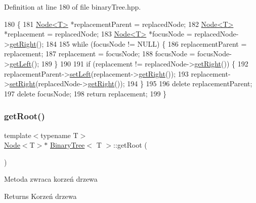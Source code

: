 Definition at line 180 of file binary\+Tree.\+hpp.


\begin{DoxyCode}
180                                                            \{
181             \hyperlink{classNode}{Node<T>} *replacementParent = replacedNode;
182             \hyperlink{classNode}{Node<T>} *replacement = replacedNode;
183             \hyperlink{classNode}{Node<T>} *focusNode = replacedNode->\hyperlink{classNode_af9078f2651b16fc1a3502d7927761df1}{getRight}();
184 
185             \textcolor{keywordflow}{while} (focusNode != NULL) \{
186                 replacementParent = replacement;
187                 replacement = focusNode;
188                 focusNode = focusNode->\hyperlink{classNode_a1c884e62ef0a9b5dd4f35dbea09145f2}{getLeft}();
189             \}
190 
191             \textcolor{keywordflow}{if} (replacement != replacedNode->\hyperlink{classNode_af9078f2651b16fc1a3502d7927761df1}{getRight}()) \{
192                 replacementParent->\hyperlink{classNode_afc70e20117ea8083d11736f5ea8a9216}{setLeft}(replacement->\hyperlink{classNode_af9078f2651b16fc1a3502d7927761df1}{getRight}());
193                 replacement->\hyperlink{classNode_ad5c1f634547b3e2d03c3d55d355c0c17}{setRight}(replacedNode->\hyperlink{classNode_af9078f2651b16fc1a3502d7927761df1}{getRight}());
194             \}
195 
196             \textcolor{keyword}{delete} replacementParent;
197             \textcolor{keyword}{delete} focusNode;
198             \textcolor{keywordflow}{return} replacement;
199         \}
\end{DoxyCode}
\mbox{\label{classBinaryTree_af525a78601eba600d880d1cd947a215a}} 
\subsubsection{\texorpdfstring{get\+Root()}{getRoot()}}
{\footnotesize\ttfamily template$<$typename T$>$ \\
\hyperlink{classNode}{Node}$<$T$>$$\ast$ \hyperlink{classBinaryTree}{Binary\+Tree}$<$ T $>$\+::get\+Root (\begin{DoxyParamCaption}{ }\end{DoxyParamCaption})\hspace{0.3cm}{\ttfamily [inline]}}

Metoda zwraca korzeń drzewa \begin{DoxyReturn}{Returns}
Korzeń drzewa 
\end{DoxyReturn}


